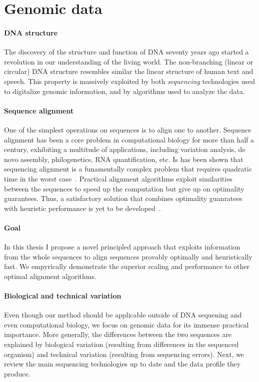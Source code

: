 \section*{Genomic data}

\paragraph{DNA structure} The discovery of the structure and function of
DNA\citep{watson1953structure} seventy years ago started a revolution in our
understanding of the living world. The non-branching (linear or circular) DNA
structure resembles similar the linear structure of human text and speech. This
property is massively exploited by both \emph{sequencing} technologies used to
digitalize genomic information, and by algorithms used to analyze the data.

\paragraph{Sequence alignment} One of the simplest operations on sequences is to
align one to another. Sequence alignment has been a core problem in
computational biology for more than half a century, exhibiting a multitude of
applications, including variation analysis, de novo assembly, philogenetics, RNA
quantification, etc. Is has been shown that sequencing alignment is a
funamentally complex problem that requires quadratic time in the worst
case~\citep{backurs2015edit}. Practical alignment algorithms exploit
similarities between the sequences to speed up the computation but give up on
optimality guarantees. Thus, a satisfactory solution that combines optimality
guanratees with heuristic performance is yet to be
developed~\citep{medvedev2022theoretical}.

\paragraph{Goal} In this thesis I propose a novel principled approach that
exploits information from the whole sequences to align sequences provably
optimally and heuristically fast. We empyrically demonstrate the superior
scaling and performance to other optimal alignment algorithms.

\paragraph{Biological and technical variation}
Even though our method should be applicable outside of DNA sequening and even
computational biology, we focus on genomic data for its immense practical
importance. More generally, the differences between the two sequences are
explained by biological variation (resulting from differences in the sequenced
organism) and technical variation (resulting from sequencing errors). Next, we
review the main sequencing technologies up to date and the data profile they
produce.

